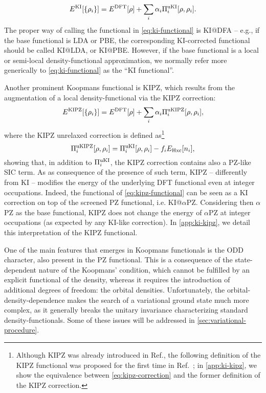 %
\begin{equation}
    E^{\rm KI}[\{\rho_i\}] = E^{\rm DFT}[\rho] + \sum_i \alpha_i \Pi_i^{\rm uKI}[\rho, \rho_i] .
    \label{eq:ki-functional}
\end{equation}
%
The proper way of calling the functional in \cref{eq:ki-functional} is KI@DFA -- e.g., if the base functional is LDA or PBE, the corresponding KI-corrected functional should be called KI@LDA, or KI@PBE. However, if the base functional is a local or semi-local density-functional approximation, we normally refer more generically to \cref{eq:ki-functional} as the ``KI functional''.

Another prominent Koopmans functional is KIPZ, which results from the augmentation of a local density-functional via the KIPZ correction:
%
\begin{equation}
    E^{\rm KIPZ}[\{\rho_i\}] = E^{\rm DFT}[\rho] + \sum_i \alpha_i \Pi_i^{\rm uKIPZ}[\rho, \rho_i] ,
    \label{eq:kipz-functional}
\end{equation}
%
where the KIPZ unrelaxed correction is defined as\footnote{Although KIPZ was already introduced in Ref.\cite{borghi_koopmans-compliant_2014}, the following definition of the KIPZ functional was proposed for the first time in Ref.~\cite{borghi_variational_2015}; in \cref{app:ki-kipz}, we show the equivalence between \cref{eq:kipz-correction} and the former definition of the KIPZ correction.}
%
\begin{equation}
    \Pi_i^{\rm uKIPZ}[\rho,\rho_i] = \Pi_i^{\rm uKI}[\rho,\rho_i] - f_i E_{\rm Hxc}[n_i] ,
    \label{eq:kipz-correction}
\end{equation}
%
showing that, in addition to $\Pi_i^{\rm uKI}$, the KIPZ correction contains also a PZ-like SIC term. As as consequence of the presence of such term, KIPZ -- differently from KI -- modifies the energy of the underlying DFT functional even at integer occupations. Indeed, the functional of \cref{eq:kipz-functional} can be seen as a KI correction on top of the screened PZ functional, i.e. KI@$\alpha$PZ. Considering then $\alpha$PZ as the base functional, KIPZ does not change the energy of $\alpha$PZ at integer occupations (as expected by any KI-like correction). In \cref{app:ki-kipz}, we detail this interpretation of the KIPZ functional.

One of the main features that emerges in Koopmans functionals is the ODD character, also present in the PZ functional. This is a consequence of the state-dependent nature of the Koopmans' condition, which cannot be fulfilled by an explicit functional of the density, whereas it requires the introduction of additional degrees of freedom: the orbital densities. Unfortunately, the orbital-density-dependence makes the search of a variational ground state much more complex, as it generally breaks the unitary invariance characterizing standard density-functionals. Some of these issues will be addressed in \cref{sec:variational-procedure}.

